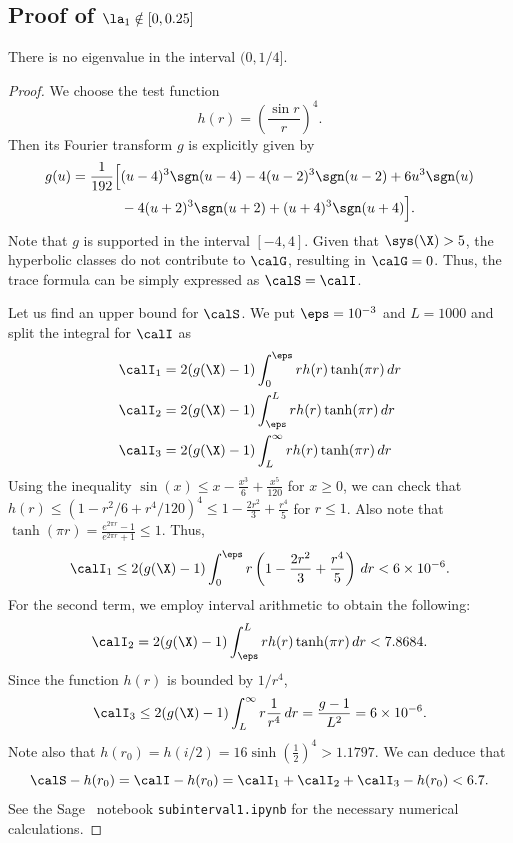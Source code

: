 \subsection{Proof of $\la_1 \notin [0, 0.25]$}
\label{subsec:subinterval1}
\begin{prop}\label{prop:subinterval1}
There is no eigenvalue in the interval $(0,1/4]$.
\end{prop}

\begin{proof}
We choose the test function
\[
h(r)=\left(\frac{\sin r}{r}\right)^{4}.
\]
Then its Fourier transform $g$ is explicitly given by
\begin{align*}
g(u) = 
\frac{1}{192} \Big[ &(u-4)^3 \sgn(u-4)  - 4 (u-2)^3 \sgn(u-2) +6 u^3 \sgn(u)  \\
&- 4 (u+2)^3 \sgn(u+2) + (u+4)^3 \sgn(u+4) \Big].
\end{align*}
Note that $g$ is supported in the interval $[-4,4]$.
Given that $\sys(\X) > 5$, the hyperbolic classes do not contribute to $\calG$, resulting in $\calG = 0$.
Thus, the trace formula can be simply expressed as $\calS = \calI$.

Let us find an upper bound for $\calS$.
We put $\eps=10^{-3}$ and $L=1000$ and split the integral for $\calI$ as
\begin{align*}
\calI_1 & = 2(g(\X)-1)\int_0^{\eps} r h(r) \tanh(\pi r) \,dr\\
\calI_2 &= 2(g(\X)-1)\int_{\eps}^{L} r h(r) \tanh(\pi r) \,dr\\
\calI_3 & = 2(g(\X)-1)\int_{L}^{\infty}  r h(r) \tanh(\pi r) \,dr
\end{align*}
Using the inequality 
$\sin(x) \leq x - \frac{x^3}{6} + \frac{x^5}{120}$ for $x\geq 0$, 
we can check that
$h(r)\leq (1 - r^2/6 + r^4/120)^4 \leq 1-\frac{2 r^2}{3}+\frac{r^4}{5}$ for $r\leq 1$.
Also note that
$\tanh(\pi r) = \frac{e^{2 \pi  r}-1}{e^{2 \pi  r}+1} \leq 1$.
Thus,
\begin{equation}\label{eq:upper_bound_I1}
\calI_1 \leq 2(g(\X)-1) \int_0^{\eps} r \left(1-\frac{2 r^2}{3}+\frac{r^4}{5}\right)\,dr
< 6\times 10^{-6}.    
\end{equation}
For the second term, we employ interval arithmetic to obtain the following:
\[
\calI_2 = 2(g(\X)-1)\int_{\eps}^{L} r h(r) \tanh(\pi r) \,dr < 7.8684.
\]
Since the function $h(r)$ is bounded by $1/r^4$, 
\[
\calI_3 \leq 2(g(\X)-1) \int_{L}^\infty r \frac{1}{r^4} \,dr  = \frac{g-1}{L^2} =  6\times 10^{-6}.
\]
Note also that
$h(r_0) = h(i/2) = 16 \sinh\left(\frac{1}{2}\right)^4 > 1.1797$.
We can deduce that 
\begin{equation}\label{upper_bound_I}
\calS-h(r_0) = \calI-h(r_0) =  \calI_1+\calI_2+\calI_3-h(r_0)<6.7.    
\end{equation}
See the Sage~\cite{sagemath} notebook \texttt{subinterval1.ipynb} for the necessary numerical calculations.


\end{proof}
